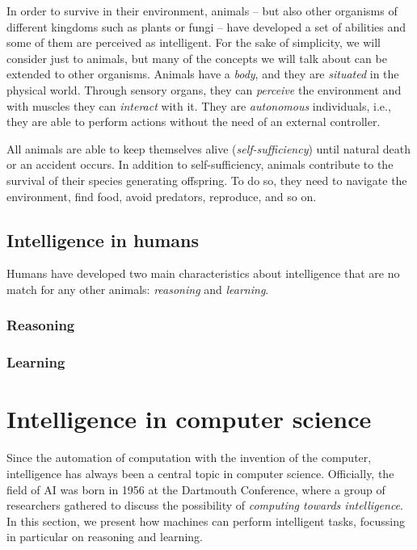 In order to survive in their environment, animals -- but also other organisms of different kingdoms such as plants or fungi -- have developed a set of abilities and some of them are perceived as intelligent.
%
For the sake of simplicity, we will consider just to animals, but many of the concepts we will talk about can be extended to other organisms.
%
Animals have a \emph{body}, and they are \emph{situated} in the physical world.
%
Through sensory organs, they can \emph{perceive} the environment and with muscles they can \emph{interact} with it.
%
They are \emph{autonomous} individuals, i.e., they are able to perform actions without the need of an external controller.


All animals are able to keep themselves alive (\emph{self-sufficiency}) until natural death or an accident occurs.
%
In addition to self-sufficiency, animals contribute to the survival of their species generating offspring.
%
To do so, they need to navigate the environment, find food, avoid predators, reproduce, and so on.
%


\subsection{Intelligence in humans}\label{subsec:intelligence-in-humans}

Humans have developed two main characteristics about intelligence that are no match for any other animals: \emph{reasoning} and \emph{learning}.

\subsubsection{Reasoning}\label{subsubsec:reasoning}
%
%

\subsubsection{Learning}\label{subsubsec:learning}
%



\section{Intelligence in computer science}\label{sec:intelligence-in-computer-science}

Since the automation of computation with the invention of the computer, intelligence has always been a central topic in computer science.
%
Officially, the field of \gls{AI} was born in 1956 at the Dartmouth Conference, where a group of researchers gathered to discuss the possibility of \emph{computing towards intelligence}.
%
In this section, we present how machines can perform intelligent tasks, focussing in particular on reasoning and learning.

